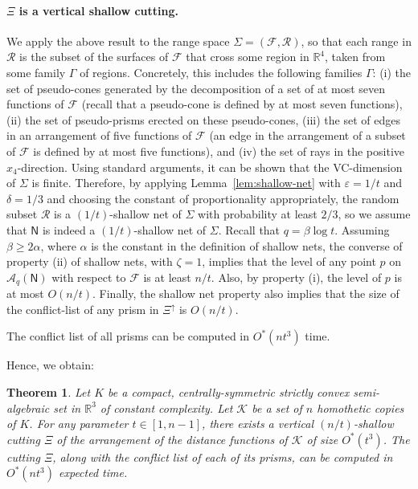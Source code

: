 \documentclass[11pt]{article}
\newif\iffullver
\def\reals{{\mathbb R}}
\def\eps{{\varepsilon}}
\def\A{\mathcal{A}}
\def\F{\mathcal{F}}
\def\K{\mathcal{K}}
\def\R{\mathcal{R}}
\def\NN{\mathsf{N}}
\newtheorem{theorem}{Theorem}[section]
\theoremstyle{definition}
\begin{document}
\paragraph{$\Xi$ is a vertical shallow cutting.}
\fi
We apply the above result to the range space $\Sigma=(\F, \R)$, %
so that each range in $\R$ is the subset of the surfaces of $\F$ that cross some region in $\reals^4$,
taken from some family $\Gamma$ of regions. Concretely, this includes the following families $\Gamma$:
(i) the set of pseudo-cones generated by the decomposition of a set of at most seven functions of $\F$ (recall that a pseudo-cone is defined by at most seven functions), 
(ii) the set of pseudo-prisms erected on these pseudo-cones, (iii) the set of edges in an arrangement 
of five functions of $\F$ (an edge in the arrangement of a subset of $\F$ 
is defined by at most five functions),
and (iv) the set of rays in the positive $x_4$-direction.
Using standard arguments, it can be shown that the VC-dimension of $\Sigma$ is finite. Therefore, by 
applying Lemma~\ref{lem:shallow-net} with $\eps=1/t$ and $\delta=1/3$ and choosing the constant of proportionality appropriately,
the random subset $\R$ is a $(1/t)$-shallow net of $\Sigma$ with probability at least $2/3$,
so we assume that $\NN$ is indeed a $(1/t)$-shallow net of $\Sigma$.
Recall that $q=\beta\log t$. Assuming $\beta\ge 2\alpha$, where $\alpha$ is the constant in the definition of shallow nets,
the converse of property (ii) of shallow nets, with $\zeta=1$, implies 
that the level of any point 
$p$ on $\A_q(\NN)$ with respect to $\F$ is  at least $n/t$.
Also, by property (i), the level of $p$  is at most $O(n/t)$. 
Finally, the shallow net property also implies that the size of the 
conflict-list of any prism in $\Xi^\uparrow$ is $O(n/t)$.
\iffullver
By testing each prism of $\Xi^\uparrow$ with every function of $\F$, 
the conflict list of all prisms can be computed in $O^*(nt^3)$ time.
\else
The conflict list of all prisms can be computed in $O^*(nt^3)$ time.
\fi
Hence, we obtain:
%
\begin{theorem}
	\label{thm:cutting}
Let $K$ be a compact, centrally-symmetric strictly convex semi-algebraic set
in $\reals^3$ of constant complexity.  Let $\K$ be a set of $n$ homothetic 
copies of $K$. For any parameter $t \in [1,n-1]$, there exists a vertical 
$(n/t)$-shallow cutting $\Xi$ of the arrangement of the distance functions of $\K$ of size $O^*(t^3)$.
The cutting $\Xi$, along with the conflict list of each of its prisms, can be computed in $O^*(nt^3)$ expected time.
\end{theorem}
%
%
\end{document}
